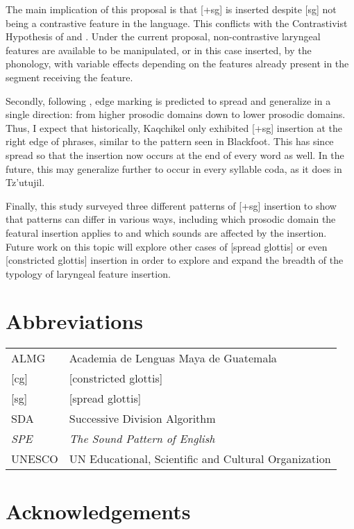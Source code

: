 \documentclass[output=paper,colorlinks,citecolor=brown]{langscibook}
\begin{document}
The main implication of this proposal is that [+sg] is inserted despite [sg] not being a contrastive feature in the language. This conflicts with the Contrastivist Hypothesis of \citet{hall_2007} and \citet{Dresher:2009}. Under the current proposal, non-contrastive laryngeal features are available to be manipulated, or in this case inserted, by the phonology, with variable effects depending on the features already present in the segment receiving the feature.

Secondly, following \citet{iverson_salmons_2007}, edge marking is predicted to spread and generalize in a single direction: from higher prosodic domains down to lower prosodic domains. Thus, I expect that historically, Kaqchikel only exhibited [+sg] insertion at the right edge of phrases, similar to the pattern seen in Blackfoot. This has since spread so that the insertion now occurs at the end of every word as well. In the future, this may generalize further to occur in every syllable coda, as it does in Tz’utujil.

Finally, this study surveyed three different patterns of [+sg] insertion to show that patterns can differ in various ways, including which prosodic domain the featural insertion applies to and which sounds are affected by the insertion. Future work on this topic will explore other cases of [spread glottis] or even [constricted glottis] insertion in order to explore and expand the breadth of the typology of laryngeal feature insertion. 

\section*{Abbreviations}
\begin{tabularx}{\textwidth}{@{}lQ@{}}
ALMG       & Academia de Lenguas Maya de Guatemala\\
{[cg]}     & {[constricted glottis]}\\
{[sg]}     & {[spread glottis]}\\
SDA        & Successive Division Algorithm\\
\emph{SPE} & \emph{The Sound Pattern of English} \citep{ChomskyHalle:1968}\\
UNESCO     & UN Educational, Scientific and Cultural Organization\\
\end{tabularx}

\section*{Acknowledgements}
\end{document}

